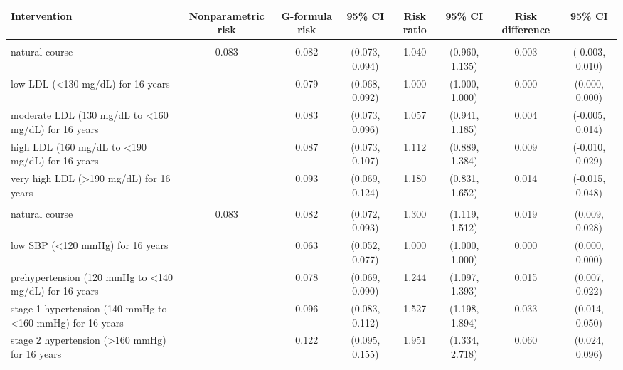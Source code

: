 \begin{table}[H]
\centering
\begin{tabular}{lccccccc}
\toprule
Intervention & Nonparametric risk & G-formula risk & 95\% CI & Risk ratio & 95\% CI & Risk difference & 95\% CI\\
\midrule
\addlinespace[0.3em]
\multicolumn{8}{l}{\textit{Interventions on LDL-cholesterol}}\\
\hspace{1em}natural course & 0.083 & 0.082 & (0.073, 0.094) & 1.040 & (0.960, 1.135) & 0.003 & (-0.003, 0.010)\\
\hspace{1em}low LDL (<130 mg/dL) for 16 years &  & 0.079 & (0.068, 0.092) & 1.000 & (1.000, 1.000) & 0.000 & (0.000, 0.000)\\
\hspace{1em}moderate LDL (130 mg/dL to <160 mg/dL) for 16 years &  & 0.083 & (0.073, 0.096) & 1.057 & (0.941, 1.185) & 0.004 & (-0.005, 0.014)\\
\hspace{1em}high LDL (160 mg/dL to <190 mg/dL) for 16 years &  & 0.087 & (0.073, 0.107) & 1.112 & (0.889, 1.384) & 0.009 & (-0.010, 0.029)\\
\hspace{1em}very high LDL (>190 mg/dL) for 16 years &  & 0.093 & (0.069, 0.124) & 1.180 & (0.831, 1.652) & 0.014 & (-0.015, 0.048)\\
\addlinespace[0.3em]
\multicolumn{8}{l}{\textit{Interventions on systolic blood pressure}}\\
\hspace{1em}natural course & 0.083 & 0.082 & (0.072, 0.093) & 1.300 & (1.119, 1.512) & 0.019 & (0.009, 0.028)\\
\hspace{1em}low SBP (<120 mmHg) for 16 years &  & 0.063 & (0.052, 0.077) & 1.000 & (1.000, 1.000) & 0.000 & (0.000, 0.000)\\
\hspace{1em}prehypertension (120 mmHg to <140 mg/dL) for 16 years &  & 0.078 & (0.069, 0.090) & 1.244 & (1.097, 1.393) & 0.015 & (0.007, 0.022)\\
\hspace{1em}stage 1 hypertension (140 mmHg to <160 mmHg) for 16 years &  & 0.096 & (0.083, 0.112) & 1.527 & (1.198, 1.894) & 0.033 & (0.014, 0.050)\\
\hspace{1em}stage 2 hypertension (>160 mmHg) for 16 years &  & 0.122 & (0.095, 0.155) & 1.951 & (1.334, 2.718) & 0.060 & (0.024, 0.096)\\
\bottomrule
\end{tabular}
\end{table}
